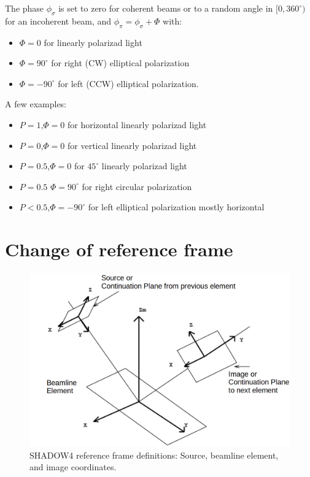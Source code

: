\documentclass{iucr}
\begin{document}
The phase $\phi_\sigma$ is set to zero for coherent beams or to a random angle in $[0,360^{\circ})$ for an incoherent beam, and
$\phi_\pi=\phi_\sigma+\Phi$ with: 
\begin{itemize}
 \item $\Phi=0$ for linearly polarizad light 
 \item $\Phi=90^{\circ}$ for right (CW) elliptical polarization
 \item $\Phi=-90^{\circ}$ for left (CCW) elliptical polarization.
\end{itemize}
A few examples: 
\begin{itemize}
 \item $P=1$,$\Phi=0$ for horizontal linearly polarizad light 
 \item $P=0$,$\Phi=0$ for vertical linearly polarizad light
 \item $P=0.5$,$\Phi=0$ for $45^\circ$ linearly polarizad light
 \item $P=0.5$ $\Phi=90^{\circ}$ for right circular polarization
 \item $P<0.5$,$\Phi=-90^{\circ}$ for left elliptical polarization mostly horizontal
\end{itemize}


\section{Change of reference frame}
\label{sec:change_frame}

\begin{figure}
\label{fig:S4_reference_frame}
    \centering
\includegraphics[width=0.9\linewidth]{figures/S4_reference_frame.png}
\caption{SHADOW4 reference frame definitions: Source, beamline element, and image coordinates.}  
\end{figure}
\end{document}
